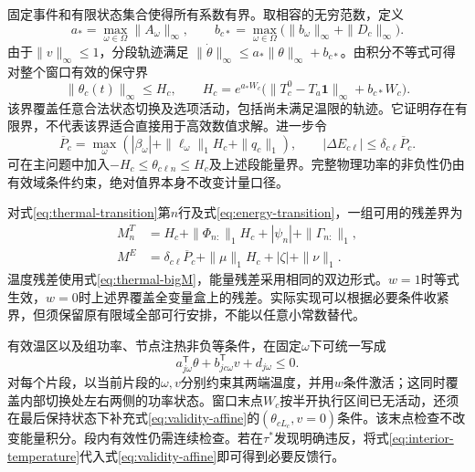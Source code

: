 固定事件和有限状态集合使得所有系数有界。取相容的无穷范数，定义
\begin{equation}
a_* =\max_{\omega\in\Omega}\|A_\omega\|_\infty,\qquad
b_{c*}=\max_{\omega\in\Omega}
\bigl(\|b_\omega\|_\infty+\|D_c\|_\infty\bigr).
\label{eq:norm-coefficients}
\end{equation}
由于\(\|v\|_\infty\le1\)，分段轨迹满足
\(\|\dot\theta\|_\infty\le a_*\|\theta\|_\infty+b_{c*}\)。由积分不等式可得对整个窗口有效的保守界
\begin{equation}
\|\theta_c(t)\|_\infty\le H_c,
\qquad H_c=e^{a_*W_c}
\bigl(\|T_c^0-T_a\mathbf1\|_\infty+b_{c*}W_c\bigr).
\label{eq:state-bound}
\end{equation}
该界覆盖任意合法状态切换及选项活动，包括尚未满足温限的轨迹。它证明存在有限界，不代表该界适合直接用于高效数值求解。进一步令
\begin{equation}
\overline P_c=\max_\omega
\left(|\beta_\omega|+\|\ell_\omega\|_1H_c+\|q_c\|_1\right),
\qquad |\Delta E_{c\ell}|\le\delta_{c\ell}\overline P_c.
\label{eq:energy-bound}
\end{equation}
可在主问题中加入\(-H_c\le\theta_{c\ell n}\le H_c\)及上述段能量界。完整物理功率的非负性仍由有效域条件约束，绝对值界本身不改变计量口径。

对式\eqref{eq:thermal-transition}第\(n\)行及式\eqref{eq:energy-transition}，一组可用的残差界为
\begin{equation}
\begin{aligned}
M^T_n&=H_c+\|\Phi_{n:}\|_1H_c+|\psi_n|+\|\Gamma_{n:}\|_1,\\
M^E&=\delta_{c\ell}\overline P_c+\|\mu\|_1H_c+|\zeta|+\|\nu\|_1.
\end{aligned}
\label{eq:residual-bounds}
\end{equation}
温度残差使用式\eqref{eq:thermal-bigM}，能量残差采用相同的双边形式。\(w=1\)时等式生效，\(w=0\)时上述界覆盖全变量盒上的残差。实际实现可以根据必要条件收紧界，但须保留原有限域全部可行安排，不能以任意小常数替代。

有效温区以及组功率、节点注热非负等条件，在固定\(\omega\)下可统一写成
\begin{equation}
a_{j\omega}^{\mathsf T}\theta+b_{jc\omega}^{\mathsf T}v+d_{j\omega}\le0.
\label{eq:validity-affine}
\end{equation}
对每个片段，以当前片段的\(\omega,v\)分别约束其两端温度，并用\(w\)条件激活；这同时覆盖内部切换处左右两侧的功率状态。窗口末点\(W_c\)按半开执行区间已无活动，还须在最后保持状态下补充式\eqref{eq:validity-affine}的\((\theta_{cL_c},v=0)\)条件。该末点检查不改变能量积分。段内有效性仍需连续检查。若在\(\tau^*\)发现明确违反，将式\eqref{eq:interior-temperature}代入式\eqref{eq:validity-affine}即可得到必要反馈行。

